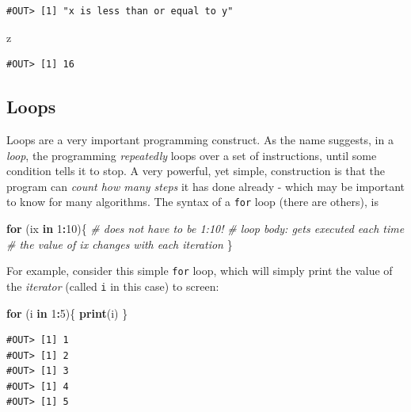 \documentclass[]{book}
\newenvironment{Shaded}{\begin{snugshade}}{\end{snugshade}}
\newcommand{\KeywordTok}[1]{\textcolor[rgb]{0.13,0.29,0.53}{\textbf{#1}}}
\newcommand{\DecValTok}[1]{\textcolor[rgb]{0.00,0.00,0.81}{#1}}
\newcommand{\CommentTok}[1]{\textcolor[rgb]{0.56,0.35,0.01}{\textit{#1}}}
\newcommand{\ControlFlowTok}[1]{\textcolor[rgb]{0.13,0.29,0.53}{\textbf{#1}}}
\newcommand{\OperatorTok}[1]{\textcolor[rgb]{0.81,0.36,0.00}{\textbf{#1}}}
\newcommand{\NormalTok}[1]{#1}
\theoremstyle{definition}
\theoremstyle{definition}
\theoremstyle{definition}
\theoremstyle{remark}
\begin{document}
\begin{verbatim}
#OUT> [1] "x is less than or equal to y"
\end{verbatim}

\begin{Shaded}
\begin{Highlighting}[]
\NormalTok{z}
\end{Highlighting}
\end{Shaded}

\begin{verbatim}
#OUT> [1] 16
\end{verbatim}

\subsection{Loops}\label{loops}

Loops are a very important programming construct. As the name suggests,
in a \emph{loop}, the programming \emph{repeatedly} loops over a set of
instructions, until some condition tells it to stop. A very powerful,
yet simple, construction is that the program can \emph{count how many
steps} it has done already - which may be important to know for many
algorithms. The syntax of a \texttt{for} loop (there are others), is

\begin{Shaded}
\begin{Highlighting}[]
\ControlFlowTok{for}\NormalTok{ (ix }\ControlFlowTok{in} \DecValTok{1}\OperatorTok{:}\DecValTok{10}\NormalTok{)\{   }\CommentTok{# does not have to be 1:10!}
  \CommentTok{# loop body: gets executed each time}
  \CommentTok{# the value of ix changes with each iteration}
\NormalTok{\}}
\end{Highlighting}
\end{Shaded}

For example, consider this simple \texttt{for} loop, which will simply
print the value of the \emph{iterator} (called \texttt{i} in this case)
to screen:

\begin{Shaded}
\begin{Highlighting}[]
\ControlFlowTok{for}\NormalTok{ (i }\ControlFlowTok{in} \DecValTok{1}\OperatorTok{:}\DecValTok{5}\NormalTok{)\{}
  \KeywordTok{print}\NormalTok{(i)}
\NormalTok{\}}
\end{Highlighting}
\end{Shaded}

\begin{verbatim}
#OUT> [1] 1
#OUT> [1] 2
#OUT> [1] 3
#OUT> [1] 4
#OUT> [1] 5
\end{verbatim}
\end{document}
